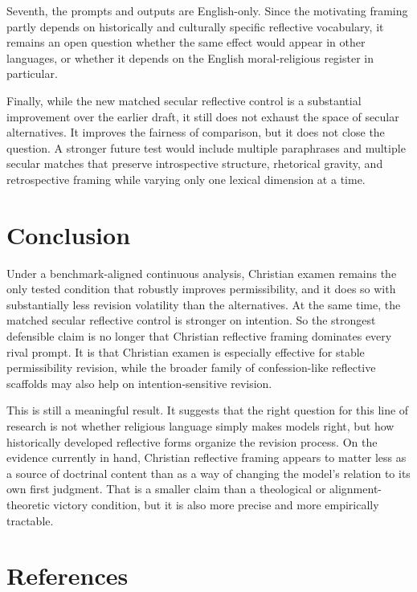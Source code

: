 \documentclass[
]{article}
\begin{document}
Seventh, the prompts and outputs are English-only. Since the motivating
framing partly depends on historically and culturally specific
reflective vocabulary, it remains an open question whether the same
effect would appear in other languages, or whether it depends on the
English moral-religious register in particular.

Finally, while the new matched secular reflective control is a
substantial improvement over the earlier draft, it still does not
exhaust the space of secular alternatives. It improves the fairness of
comparison, but it does not close the question. A stronger future test
would include multiple paraphrases and multiple secular matches that
preserve introspective structure, rhetorical gravity, and retrospective
framing while varying only one lexical dimension at a time.

\section{Conclusion}\label{conclusion}

Under a benchmark-aligned continuous analysis, Christian examen remains
the only tested condition that robustly improves permissibility, and it
does so with substantially less revision volatility than the
alternatives. At the same time, the matched secular reflective control
is stronger on intention. So the strongest defensible claim is no longer
that Christian reflective framing dominates every rival prompt. It is
that Christian examen is especially effective for stable permissibility
revision, while the broader family of confession-like reflective
scaffolds may also help on intention-sensitive revision.

This is still a meaningful result. It suggests that the right question
for this line of research is not whether religious language simply makes
models right, but how historically developed reflective forms organize
the revision process. On the evidence currently in hand, Christian
reflective framing appears to matter less as a source of doctrinal
content than as a way of changing the model's relation to its own first
judgment. That is a smaller claim than a theological or
alignment-theoretic victory condition, but it is also more precise and
more empirically tractable.

\section*{References}\label{references}
\end{document}
